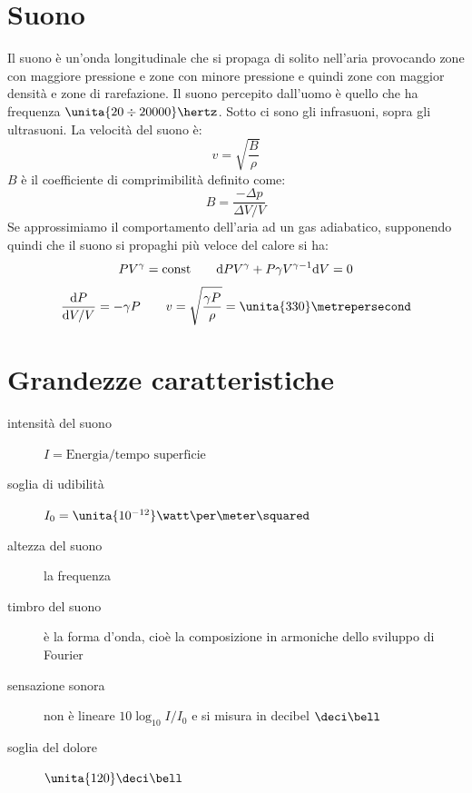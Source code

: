 \section{Suono}
Il suono è un'onda longitudinale che si propaga di solito nell'aria provocando zone con maggiore pressione e zone con minore pressione e quindi zone con maggior densità e zone di rarefazione. Il suono percepito dall'uomo è quello che ha frequenza $\unita{20\div20000}\hertz$. Sotto ci sono gli infrasuoni, sopra gli ultrasuoni. La velocità del suono è:
\begin{equation}
v=\sqrt{\frac{B}{\rho}}
\end{equation}
$B$ è il coefficiente di comprimibilità definito come:
\begin{equation}
B=\frac{-\Delta p}{\Delta V/V}
\end{equation}
Se approssimiamo il comportamento dell'aria ad un gas adiabatico, supponendo quindi che il suono si propaghi più veloce del calore si ha:
\begin{equation*}PV^\gamma=\text{const}\qquad \mathrm{d} PV^\gamma+P\gamma V^{\gamma-1}\mathrm{d} V=0\end{equation*}
\begin{equation*}\frac{\ud P}{\ud V/V}=-\gamma P\qquad v=\sqrt{\frac{\gamma P}{\rho}}=\unita{330}\metrepersecond\end{equation*}
\section{Grandezze caratteristiche}
\begin{description}
\item[intensità del suono] $I=\text{Energia}/\text{tempo superficie}$\\
\item[soglia di udibilità] $I_0=\unita{10^{-12}}\watt\per\meter\squared$\\
\item[altezza del suono]la frequenza\\
\item[timbro del suono] è la forma d'onda, cioè la composizione in armoniche dello sviluppo di Fourier\\
\item[sensazione sonora] non è lineare $10\log_{10} I/I_0$ e si misura in decibel $\deci\bell$\\
\item[soglia del dolore] $\unita{120}\deci\bell$\\
\end{description}




























